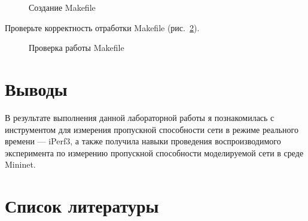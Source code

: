 \documentclass[
  english,
  russian,
  12pt,
  a4paper,
  DIV=11,
  numbers=noendperiod]{scrreprt}
\begin{document}
\begin{figure}


\caption{\label{fig-011}Создание Makefile}

\end{figure}%

Проверьте корректность отработки Makefile (рис.~\ref{fig-012}).

\begin{figure}


\caption{\label{fig-012}Проверка работы Makefile}

\end{figure}%

\chapter{Выводы}\label{ux432ux44bux432ux43eux434ux44b}

В результате выполнения данной лабораторной работы я познакомилась с
инструментом для измерения пропускной способности сети в режиме
реального времени --- iPerf3, а также получила навыки проведения
воспроизводимого эксперимента по измерению пропускной способности
моделируемой сети в среде Mininet.

\chapter*{Список
литературы}\label{ux441ux43fux438ux441ux43eux43a-ux43bux438ux442ux435ux440ux430ux442ux443ux440ux44b}

\printbibliography[heading=none]
\end{document}
